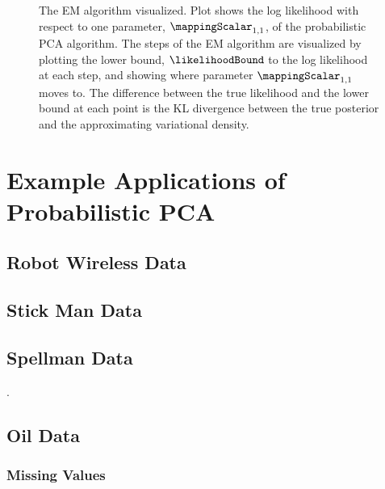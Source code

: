 \begin{figure}
  \begin{matlab}
  
\end{matlab}
%
\caption{The EM algorithm visualized. Plot shows the log likelihood
  with respect to one parameter, $\mappingScalar_{1, 1}$, of the
  probabilistic PCA algorithm. The steps of the EM algorithm are
  visualized by plotting the lower bound, $\likelihoodBound$ to the log
  likelihood at each step, and showing where parameter
  $\mappingScalar_{1, 1}$ moves to. The difference between the true
  likelihood and the lower bound at each point is the KL
  divergence between the true
  posterior and the approximating variational density.}
\end{figure}

\section{Example Applications of Probabilistic PCA}

\subsection{Robot Wireless Data}

\subsection{Stick Man Data}

\subsection{Spellman Data}

.

\subsection{Oil Data}

\subsubsection{Missing Values}

